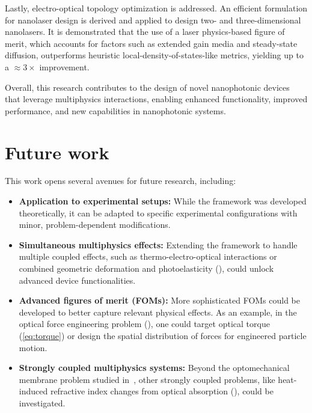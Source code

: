Lastly, electro-optical topology optimization is addressed. An efficient formulation for nanolaser design is derived and applied to design two- and three-dimensional nanolasers. It is demonstrated that the use of
 a laser physics-based figure of merit, which accounts for factors such as extended gain media and steady-state diffusion, outperforms
  heuristic local-density-of-states-like metrics, yielding up to a $\approx 3\times$ improvement.

Overall, this research contributes to the design of novel nanophotonic devices that leverage multiphysics interactions, enabling enhanced functionality, improved performance, and new capabilities in nanophotonic systems.

\section{Future work}

This work opens several avenues for future research, including:

\begin{itemize}
    \item \textbf{Application to experimental setups:} While the framework was developed theoretically, it can be adapted to specific experimental configurations with minor, problem-dependent modifications.
    
    
    \item \textbf{Simultaneous multiphysics effects:} Extending the framework to handle multiple coupled effects, such as thermo-electro-optical interactions or combined geometric deformation and photoelasticity (), could unlock advanced device functionalities.
    
    \item \textbf{Advanced figures of merit (FOMs):} More sophisticated FOMs could be developed to better capture relevant physical effects. As an example, in the optical force engineering problem (), one could target optical torque (\eqref{eq:torque}) or design the spatial distribution of forces for engineered particle motion.
    
    \item \textbf{Strongly coupled multiphysics systems:} Beyond the optomechanical membrane problem studied in~, other strongly coupled problems, like heat-induced refractive index changes from optical absorption (), could be investigated.
    
\end{itemize}